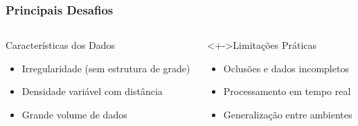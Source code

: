 \documentclass[aspectratio=169,t,xcolor=table]{beamer}
\begin{document}
\begin{frame}
    \frametitle{Principais Desafios}
    \begin{columns}[T]
        \begin{column}{.5\textwidth}
            \begin{block}{Características dos Dados}
                \begin{itemize}
                    \item<+-> Irregularidade (sem estrutura de grade)
                    \item<+-> Densidade variável com distância
                    \item<+-> Grande volume de dados
                \end{itemize}
            \end{block}
        \end{column}
        \begin{column}{.5\textwidth}
            \begin{block}<+->{Limitações Práticas}
                \begin{itemize}
                    \item<+-> Oclusões e dados incompletos
                    \item<+-> Processamento em tempo real
                    \item<+-> Generalização entre ambientes
                \end{itemize}
            \end{block}
        \end{column}
    \end{columns}
\end{frame}
\end{document}
